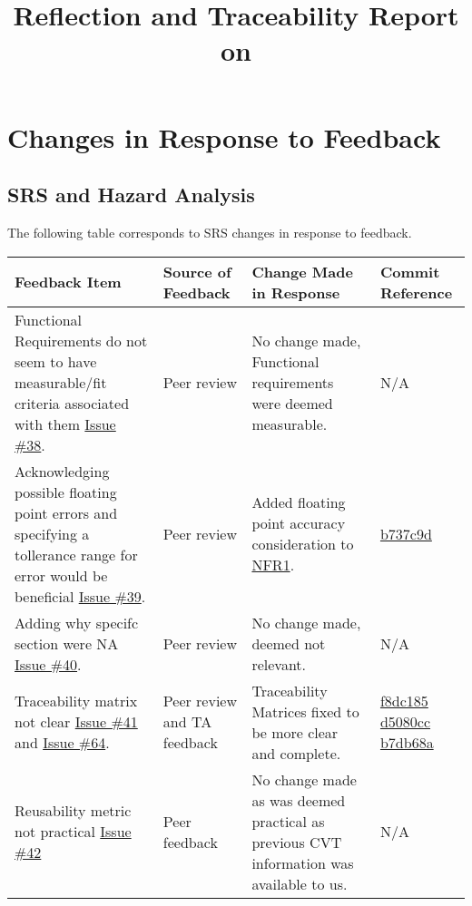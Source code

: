 \documentclass{article}
\title{Reflection and Traceability Report on \progname}
\author{\authname}
\date{}
\begin{document}
\maketitle


\section{Changes in Response to Feedback}

\subsection{SRS and Hazard Analysis}

The following table corresponds to SRS changes in response to feedback.

    \begin{longtable}{|p{4cm}|p{1.5cm}|p{4cm}|p{1.5cm}|}
    \hline
    \textbf{Feedback Item} & \textbf{Source of Feedback} & \textbf{Change Made in Response} & \textbf{Commit Reference} \\
    \hline
    \endfirsthead
    \hline
    \endhead
    \hline
    \endfoot
    \hline
    \endlastfoot
    Functional Requirements do not seem to have measurable/fit criteria associated with them \href{https://github.com/gr812b/CVT-Simulator/issues/38}{Issue \#38}. & Peer review  & No change made, Functional requirements were deemed measurable. & N/A \\
    \hline 
    Acknowledging possible floating point errors and specifying a tollerance range for error would be beneficial \href{https://github.com/gr812b/CVT-Simulator/issues/39}{Issue \#39}. & Peer review  & Added floating point accuracy consideration to \href{https://github.com/gr812b/CVT-Simulator/blob/main/docs/SRS/SRS.pdf}{NFR1}. 
    & \href{https://github.com/gr812b/CVT-Simulator/commit/b737c9dca12893fff6071cc0cf9fcc4c4b4d7a93}{b737c9d} \\
   
    \hline 
    Adding why specifc section were NA \href{https://github.com/gr812b/CVT-Simulator/issues/40}{Issue \#40}. & Peer review & No change made, deemed not relevant. & N/A\\
    \hline
    Traceability matrix not clear \href{https://github.com/gr812b/CVT-Simulator/issues/41}{Issue \#41} and \href{https://github.com/gr812b/CVT-Simulator/issues/64}{Issue \#64}. & Peer review and TA feedback & Traceability Matrices fixed to be more clear and complete.
    & \href{https://github.com/gr812b/CVT-Simulator/commit/f8dc185e533e52c5260595c5b1c8d48bb4db3ff8}{f8dc185}  
    \href{https://github.com/gr812b/CVT-Simulator/commit/d5080cc95e629483f81ea46df03fbcc2f9c454eb}{d5080cc}  
    \href{https://github.com/gr812b/CVT-Simulator/commit/b7db68a977e81676ac26ccea8c662e55feb7d087}{b7db68a} 
    \\
    \hline
    Reusability metric not practical \href{https://github.com/gr812b/CVT-Simulator/issues/42}{Issue \#42} & Peer feedback & No change made as was deemed practical as previous CVT information was available to us. & N/A\\


\end{longtable}
\end{document}
